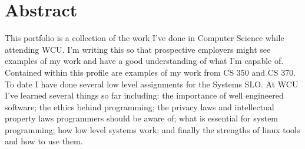 \chapter*{Abstract}\label{abstract}
This portfolio is a collection of the work I've done in Computer Science while attending WCU. I'm writing this so that prospective employers might see examples of my work and have a good understanding of what I'm capable of. Contained within this profile are examples of my work from CS 350 and CS 370. To date I have done several low level assignments for the Systems SLO. At WCU I've learned several things so far including: the importance of well engineered software; the ethics behind programming; the privacy laws and intellectual property laws programmers should be aware of; what is essential for system programming; how low level systems work; and finally the strengths of linux tools and how to use them.
